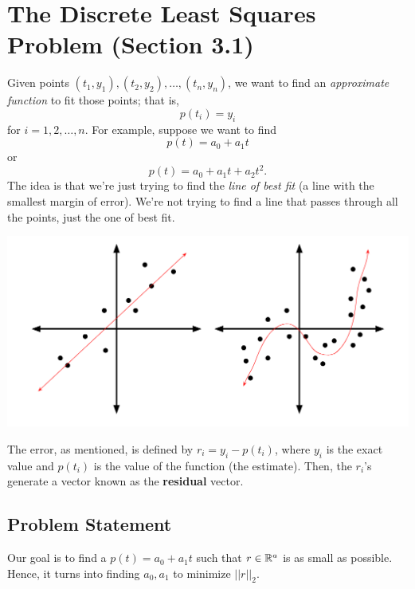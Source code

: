 \documentclass[letterpaper]{article}
\newcommand{\0}{\mathbf{0}}
\begin{document}
\section{The Discrete Least Squares Problem (Section 3.1)}
Given points $(t_1, y_1), (t_2, y_2), \hdots, (t_n, y_n)$, we want to find an \emph{approximate function} to fit those points; that is, \[p(t_i) = y_i\] for $i = 1, 2, \hdots, n$. For example, suppose we want to find \[p(t) = a_0 + a_1 t\] or \[p(t) = a_0 + a_1 t + a_2 t^2.\] The idea is that we're just trying to find the \emph{line of best fit} (a line with the smallest margin of error). We're not trying to find a line that passes through all the points, just the one of best fit.
\begin{center}
    \includegraphics[scale=0.7]{assets/line_best_fit.png}
\end{center}
The error, as mentioned, is defined by $r_i = y_i - p(t_i)$, where $y_i$ is the exact value and $p(t_i)$ is the value of the function (the estimate). Then, the $r_i$'s generate a vector known as the \textbf{residual} vector.

\subsection{Problem Statement}
Our goal is to find a $p(t) = a_0 + a_1 t$ such that $r \in \mathbb{R}^a$ is as small as possible. Hence, it turns into finding $a_0, a_1$ to minimize $||r||_2$. 
\end{document}
